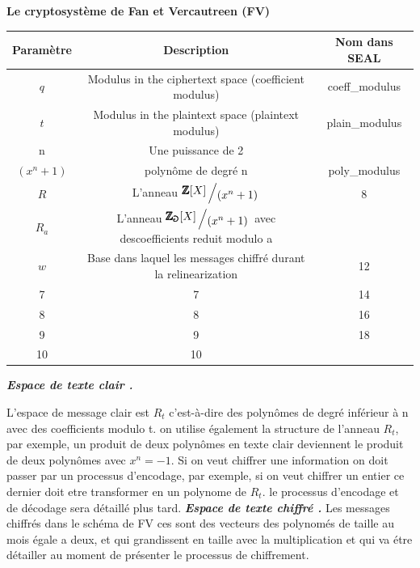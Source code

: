 \documentclass[a4paper,11pt]{report}
\begin{document}
\textbf{Le cryptosystème de Fan et Vercautreen (FV)}\newline
\newline
\newline
\vspace{100\baselineskip}
\newcommand{\bigslant}[2]{{\raisebox{.2em}{$#1$}\left/\raisebox{-.2em}{$#2$}\right.}}
\begin{tabular}{|c|c|c|}

\hline
 Paramètre& Description & Nom dans SEAL \\
\hline
$q$ & Modulus in the ciphertext space (coefficient modulus) & coeff\_modulus  \\
\hline
$t$ & Modulus in the plaintext space (plaintext modulus) & plain\_modulus \\
\hline
n & Une puissance de 2 &   \\
\hline
$(x^{n}+1)$ & polynôme de degré n  & poly\_modulus  \\
\hline
$R$ & L'anneau $\bigslant{\pmb{\mathbb{Z}}[X]}{(x^{n}+1)}$ & 8  \\
\hline
$R_a$ & L'anneau $\bigslant{\pmb{\mathbb{Z_a}}[X]}{(x^{n}+1)}$ avec descoefficients reduit modulo a &  \\
\hline
$w$ & Base dans laquel les messages chiffré durant la relinearization & 12 \\
\hline
7 & 7 & 14 \\
\hline
8 & 8 & 16 \\
\hline
9 & 9 & 18 \\
\hline
10 & 10 & \\
\hline

\end{tabular}
\newline
\textbf{\textit{ Espace de texte clair .}}\newline

L'espace de message clair est $R_t$ c'est-à-dire des polynômes de degré inférieur à n avec des coefficients modulo t. on utilise également la structure de l'anneau $R_t$, par exemple, un produit de deux polynômes en texte clair deviennent le produit de deux polynômes avec $x^n = -1$.\newline
Si on veut chiffrer une information on doit passer par un processus d'encodage, par exemple, si on veut chiffrer un entier ce dernier doit etre transformer en un polynome de $R_t$. le processus d'encodage et de décodage sera détaillé plus tard.\newline 
\textbf{\textit{ Espace de texte chiffré .}}\newline
Les messages chiffrés dans le schéma de FV ces sont des vecteurs  des polynomés de taille au mois égale a deux, et qui grandissent en taille avec la multiplication et qui va étre détailler au moment de présenter le processus de chiffrement. 
\end{document}
